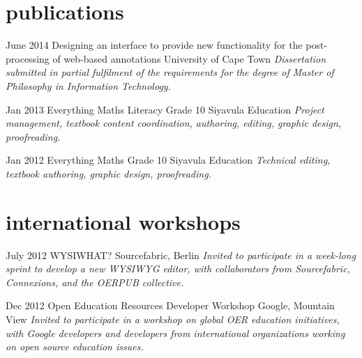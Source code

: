 \documentclass[]{friggeri-cv} %
\begin{document}
\section{publications}
\begin{entrylist}
\entry
{June 2014}
{Designing an interface to provide new
functionality for the post-processing of
web-based annotations}
{University of Cape Town}
{\emph{
Dissertation submitted in partial fulfilment of the requirements
for the degree of Master of Philosophy in Information Technology.} 
 }



\entry
{Jan 2013}
{Everything Maths Literacy Grade 10}
{Siyavula Education}
{\emph{Project management, textbook content coordination, authoring, editing, graphic design, proofreading.}}

\entry
{Jan 2012}
{Everything Maths Grade 10}
{Siyavula Education}
{\emph{Technical editing, textbook authoring, graphic design, proofreading.}}

\end{entrylist}


\section{international workshops}

\begin{entrylist}
\entry
{July 2012}
{WYSIWHAT?}
{Sourcefabric, Berlin}
{\emph{Invited to participate in a week-long sprint to develop a new WYSIWYG editor, with collaborators from Sourcefabric, Connexions, and the OERPUB collective.}}

\entry
{Dec 2012}
{Open Education Resources Developer Workshop}
{Google, Mountain View}
{\emph{Invited to participate in a workshop on global OER education initiatives, with Google developers and developers from international organizations working on open source education issues.}}

\end{entrylist}
\end{document}

